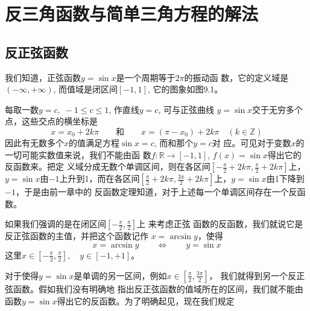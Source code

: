 \chapter{反三角函数与简单三角方程的解法}
\section{反正弦函数}
我们知道，正弦函数$y=\sin x$是一个周期等于$2\pi$的振动函
数，它的定义域是$(-\infty,+\infty)$, 而值域是闭区间$[-1,1]$, 它的图象如图9.1。

\begin{figure}[htp]
    \centering
{}
    \caption{}
\end{figure}


每取一数$y=c,\; -1\le c\le 1$, 作直线$y=c$, 可与正弦曲线
$y=\sin x$交于无穷多个点，这些交点的横坐标是
\[x=x_0+2k\pi\qquad \text{和}\qquad x=(\pi -x_0)+2k\pi\quad (k\in\mathbb{Z})\]
因此有无数多个$x$的值满足方程$\sin x =c$, 而和那个$y=c$对
应。可见对于变数$x$的一切可能实数值来说，我们不能由函
数$f:\mathbb{R}\to [-1,1]$, $f(x)=\sin x$得出它的反函数来。把定
义域分成无数个单调区间，则在各区间$\left[-\frac{\pi}{2}+2k\pi, \frac{\pi}{2}+2k\pi\right]$上，$y=\sin x$由$-1$上升到1，而在各区间$\left[\frac{\pi}{2}+2k\pi, \frac{3\pi}{2}+2k\pi\right]$上，$y=\sin x$由1下降到$-1$，于是由前一章中的
反函数定理知道，对于上述每一个单调区间存在一个反函数。

如果我们强调的是在闭区间$\left[-\frac{\pi}{2},\frac{\pi}{2}\right]$上
来考虑正弦
函数的反函数，我们就说它是反正弦函数的主值，并把这个函数记作
$x=\arcsin y$，使得
$$x=\arcsin y\qquad \Longleftrightarrow \qquad y=\sin x$$
这里$x\in \left[-\frac{\pi}{2},\frac{\pi}{2}\right],\quad y\in[-1,+1]$。

对于使得$y=\sin x$是单调的另一区间，例如$x\in \left[\frac{\pi}{2},\frac{3\pi}{2}\right]$，
我们就得到另一个反正弦函数。假如我们没有明确地
指出反正弦函数的值域所在的区间，我们就不能由函数$y=\sin x$得出它的反函数。为了明确起见，现在我们规定

